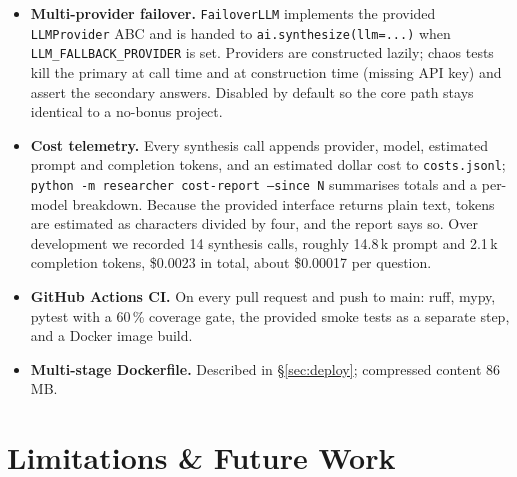 \documentclass[11pt,a4paper]{article}
\begin{document}
\begin{itemize}[topsep=2pt,itemsep=2pt]
  \item \textbf{Multi-provider failover.} \texttt{FailoverLLM} implements the provided \texttt{LLMProvider} ABC and is handed to \texttt{ai.synthesize(llm=...)} when \texttt{LLM\_FALLBACK\_PROVIDER} is set. Providers are constructed lazily; chaos tests kill the primary at call time and at construction time (missing API key) and assert the secondary answers. Disabled by default so the core path stays identical to a no-bonus project.
  \item \textbf{Cost telemetry.} Every synthesis call appends provider, model, estimated prompt and completion tokens, and an estimated dollar cost to \texttt{costs.jsonl}; \texttt{python -m researcher cost-report --since N} summarises totals and a per-model breakdown. Because the provided interface returns plain text, tokens are estimated as characters divided by four, and the report says so. Over development we recorded 14 synthesis calls, roughly 14.8\,k prompt and 2.1\,k completion tokens, \$0.0023 in total, about \$0.00017 per question.
  \item \textbf{GitHub Actions CI.} On every pull request and push to main: ruff, mypy, pytest with a 60\,\% coverage gate, the provided smoke tests as a separate step, and a Docker image build.
  \item \textbf{Multi-stage Dockerfile.} Described in \S\ref{sec:deploy}; compressed content 86\,MB.
\end{itemize}

\section{Limitations \& Future Work}\label{sec:limits}
\end{document}
